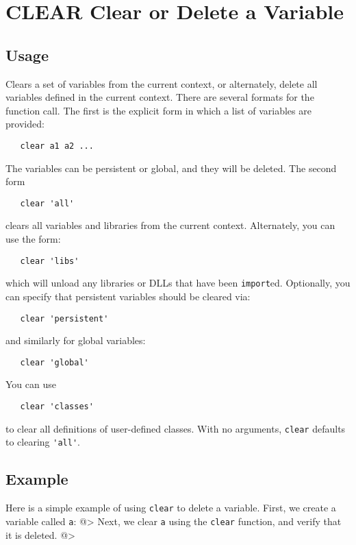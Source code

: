 \section{CLEAR Clear or Delete a Variable}

\subsection{Usage}

Clears a set of variables from the current context, or alternately, 
delete all variables defined in the current context.  There are
several formats for the function call.  The first is the explicit form
in which a list of variables are provided:
\begin{verbatim}
   clear a1 a2 ...
\end{verbatim}
The variables can be persistent or global, and they will be deleted.
The second form
\begin{verbatim}
   clear 'all'
\end{verbatim}
clears all variables and libraries from the current context.  Alternately, you can
use the form:
\begin{verbatim}
   clear 'libs'
\end{verbatim}
which will unload any libraries or DLLs that have been \verb|import|ed. 
Optionally, you can specify that persistent variables should be cleared via:
\begin{verbatim}
   clear 'persistent'
\end{verbatim}
and similarly for global variables:
\begin{verbatim}
   clear 'global'
\end{verbatim}
You can use
\begin{verbatim}
   clear 'classes'
\end{verbatim}
to clear all definitions of user-defined classes.
With no arguments, \verb|clear| defaults to clearing \verb|'all'|.
\subsection{Example}

Here is a simple example of using \verb|clear| to delete a variable.  First, we create a variable called \verb|a|:
@>
Next, we clear \verb|a| using the \verb|clear| function, and verify that it is deleted.
@>
